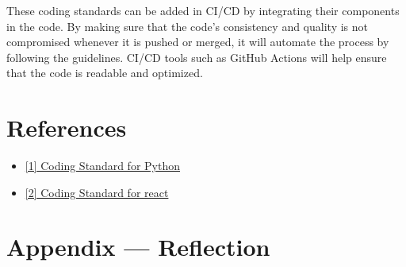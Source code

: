 \documentclass{article}
\begin{document}
These coding standards can be added in CI/CD by integrating their components in the code. By making sure that the code's consistency and quality is not compromised whenever it is pushed or merged, it will automate the process by following the guidelines.
CI/CD tools such as GitHub Actions will help ensure that the code is readable and optimized. 

\section{References}
\begin{itemize}
  \item
  \href{https://www.geeksforgeeks.org/pep-8-coding-style-guide-python/}{[1] Coding Standard for Python}
  \item
  \href{https://airbnb.io/javascript/react/} {[2] Coding Standard for react}
\end {itemize}

\newpage{}

\section*{Appendix --- Reflection}


% 
\end{document}

